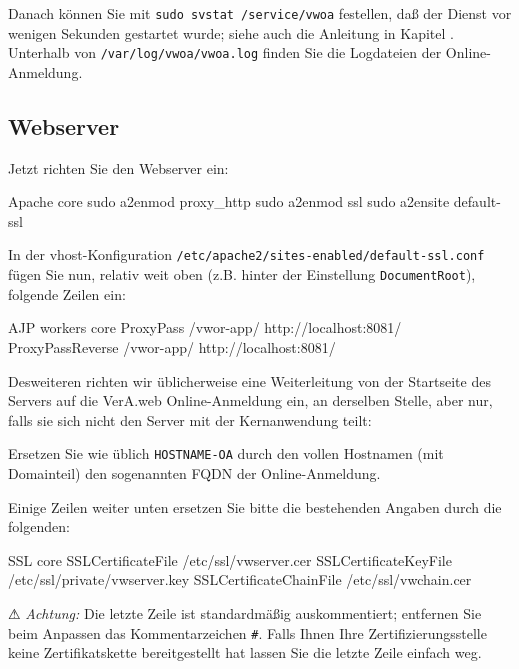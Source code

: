 Danach können Sie mit \texttt{sudo svstat /service/vwoa} festellen,
daß der Dienst vor wenigen Sekunden gestartet wurde; siehe
auch die Anleitung in Kapitel .
Unterhalb von \texttt{/var/log/vwoa/vwoa.log} finden Sie die
Logdateien der Online-Anmeldung.

\subsection{Webserver}\label{subsec:setup-oa-apache}

\begin{minipage}{\linewidth}
Jetzt richten Sie den Webserver ein:

\begin{lstdump}{Apache core}
sudo a2enmod proxy_http
sudo a2enmod ssl
sudo a2ensite default-ssl
\end{lstdump}
\end{minipage}

\begin{minipage}{\linewidth}
In der vhost-Konfiguration \texttt{/etc/apache2/sites-enabled/default-ssl.conf}
fügen Sie nun, relativ weit oben (z.B. hinter der Einstellung
\texttt{DocumentRoot}), folgende Zeilen ein:

\begin{lstdump}{AJP workers core}
ProxyPass /vwor-app/ http://localhost:8081/
ProxyPassReverse /vwor-app/ http://localhost:8081/
\end{lstdump}
\end{minipage}

\begin{minipage}{\linewidth}
Desweiteren richten wir üblicherweise eine Weiterleitung von der
Startseite des Servers auf die VerA.web Online-Anmeldung ein, an
derselben Stelle, aber nur, falls sie sich nicht den Server mit
der Kernanwendung teilt:

\end{minipage}

Ersetzen Sie wie üblich \texttt{HOSTNAME-OA} durch den vollen
Hostnamen (mit Domainteil) \dash den sogenannten FQDN \dash der
Online-Anmeldung.

\begin{minipage}{\linewidth}
Einige Zeilen weiter unten ersetzen Sie bitte die bestehenden
Angaben durch die folgenden:

\begin{lstdump}{SSL core}
SSLCertificateFile /etc/ssl/vwserver.cer
SSLCertificateKeyFile /etc/ssl/private/vwserver.key
SSLCertificateChainFile /etc/ssl/vwchain.cer
\end{lstdump}

⚠ \emph{Achtung:} Die letzte Zeile ist standardmäßig auskommentiert;
entfernen Sie beim Anpassen das Kommentarzeichen \texttt{\#}. Falls
Ihnen Ihre Zertifizierungsstelle keine Zertifikatskette bereitgestellt
hat lassen Sie die letzte Zeile einfach weg.
\end{minipage}


